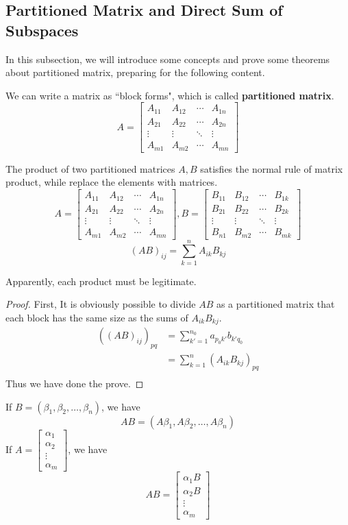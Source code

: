 \documentclass{article}
\begin{document}
\subsection{Partitioned Matrix and Direct Sum of Subspaces}
In this subsection, we will introduce some concepts and prove some theorems about partitioned matrix, preparing for the following content.
\begin{dde}
	We can write a matrix as ``block forms", which is called \textbf{partitioned matrix}.
	\[A=\begin{bmatrix}
		A_{11}&A_{12}&\cdots&A_{1n}\\
		A_{21}&A_{22}&\cdots&A_{2n}\\
		\vdots&\vdots&\ddots&\vdots\\
		A_{m1}&A_{m2}&\cdots&A_{mn}
	\end{bmatrix}\]
\end{dde}
\begin{thm}
	The product of two partitioned matrices $A,B$ satisfies the normal rule of matrix product, while replace the elements with matrices.
	\[A=\begin{bmatrix}
		A_{11}&A_{12}&\cdots&A_{1n}\\
		A_{21}&A_{22}&\cdots&A_{2n}\\
		\vdots&\vdots&\ddots&\vdots\\
		A_{m1}&A_{m2}&\cdots&A_{mn}
	\end{bmatrix},B=\begin{bmatrix}
	B_{11}&B_{12}&\cdots&B_{1k}\\
	B_{21}&B_{22}&\cdots&B_{2k}\\
	\vdots&\vdots&\ddots&\vdots\\
	B_{n1}&B_{m2}&\cdots&B_{mk}
	\end{bmatrix}\]
	\[(AB)_{ij}=\sum\limits_{k=1}^nA_{ik}B_{kj}\]
\end{thm}
Apparently, each product must be legitimate. 
\begin{proof}
	First, It is obviously possible to divide $AB$ as a partitioned matrix that each block has the same size as the sums of $A_{ik}B_{kj}$.
	\begin{align*}
		((AB)_{ij})_{pq}&=\sum\limits_{k'=1}^{n_0}a_{p_0k'}b_{k'q_0}\\
		&=\sum\limits_{k=1}^n(A_{ik}B_{kj})_{pq}\\
	\end{align*}
	Thus we have done the prove.
\end{proof}
\begin{coro}
	If $B=(\beta_1,\beta_2,\dots,\beta_n)$, we have
	\[AB=(A\beta_1,A\beta_2,\dots,A\beta_n)\]
	If $A=\begin{bmatrix}
		\alpha_1\\
		\alpha_2\\
		\vdots\\
		\alpha_m
	\end{bmatrix}$, we have
	\[AB=\begin{bmatrix}
		\alpha_1B\\
		\alpha_2B\\
		\vdots\\
		\alpha_m
	\end{bmatrix}\]
\end{coro}
\end{document}
